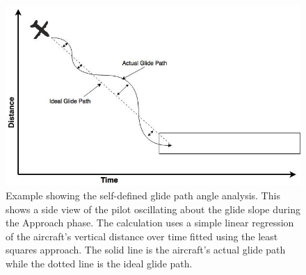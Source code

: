             
            \begin{figure}
            	\centering
                \includegraphics[width=\linewidth]{img/self_defined_example.jpg}
                \caption{Example showing the self-defined glide path angle analysis.  This shows a side view of the pilot oscillating about the glide slope during the Approach phase.  The calculation uses a simple linear regression of the aircraft's vertical distance over time fitted using the least squares approach.  The solid line is the aircraft's actual glide path while the dotted line is the ideal glide path.}
                \label{fig:self_defined_example}
            \end{figure}
            
